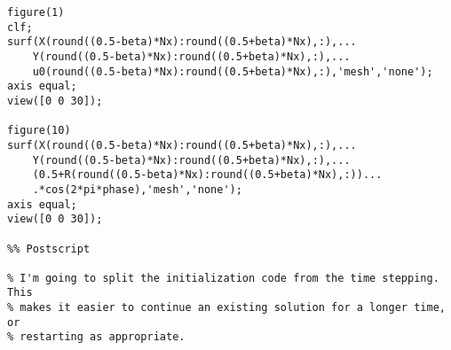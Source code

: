 \documentclass[12pt]{article}
\newcounter{solution}
\begin{document}
\begin{verbatim}
figure(1)
clf;
surf(X(round((0.5-beta)*Nx):round((0.5+beta)*Nx),:),...
    Y(round((0.5-beta)*Nx):round((0.5+beta)*Nx),:),...
    u0(round((0.5-beta)*Nx):round((0.5+beta)*Nx),:),'mesh','none');
axis equal;
view([0 0 30]);

figure(10)
surf(X(round((0.5-beta)*Nx):round((0.5+beta)*Nx),:),...
    Y(round((0.5-beta)*Nx):round((0.5+beta)*Nx),:),...
    (0.5+R(round((0.5-beta)*Nx):round((0.5+beta)*Nx),:))...
    .*cos(2*pi*phase),'mesh','none');
axis equal;
view([0 0 30]);

%% Postscript

% I'm going to split the initialization code from the time stepping. This
% makes it easier to continue an existing solution for a longer time, or
% restarting as appropriate.
    
\end{verbatim}
\end{document}

